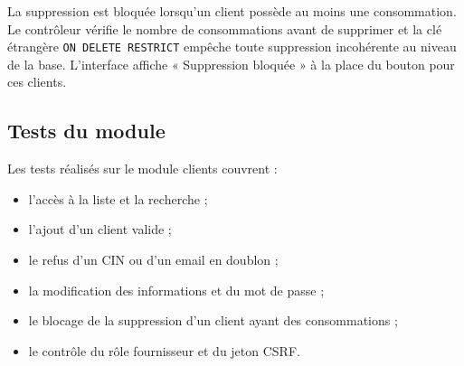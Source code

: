 La suppression est bloquée lorsqu'un client possède au moins une consommation. Le contrôleur vérifie le nombre de consommations avant de supprimer et la clé étrangère \texttt{ON DELETE RESTRICT} empêche toute suppression incohérente au niveau de la base. L'interface affiche « Suppression bloquée » à la place du bouton pour ces clients.

\subsection{Tests du module}

Les tests réalisés sur le module clients couvrent :

\begin{itemize}[leftmargin=*]
  \item l'accès à la liste et la recherche ;
  \item l'ajout d'un client valide ;
  \item le refus d'un CIN ou d'un email en doublon ;
  \item la modification des informations et du mot de passe ;
  \item le blocage de la suppression d'un client ayant des consommations ;
  \item le contrôle du rôle fournisseur et du jeton CSRF.
\end{itemize}
